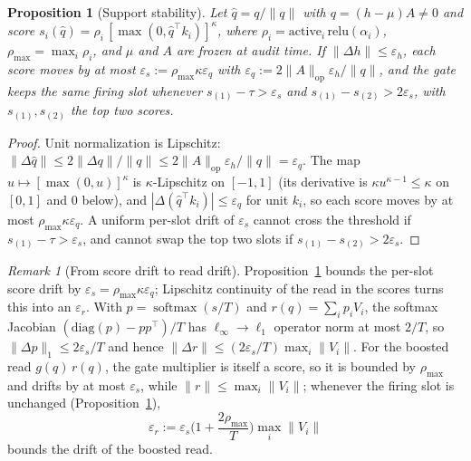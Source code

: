 \documentclass[11pt]{article}
\newtheorem{proposition}{Proposition}
\theoremstyle{remark}
\newtheorem{remark}{Remark}
\DeclareMathOperator{\softmax}{softmax}
\begin{document}
\begin{proposition}[Support stability]
\label{prop:support}
Let $\hat q=q/\lVert q\rVert$ with $q=(h-\mu)A\neq0$ and score
$s_i(\hat q)=\rho_i\,[\max(0,\hat q^{\top}k_i)]^{\kappa}$, where
$\rho_i=\mathrm{active}_i\,\mathrm{relu}(\alpha_i)$,
$\rho_{\max}=\max_i\rho_i$, and $\mu$ and $A$ are frozen at audit time. If
$\lVert\Delta h\rVert\le\varepsilon_h$, each score moves by at most
$\varepsilon_s:=\rho_{\max}\kappa\varepsilon_q$ with
$\varepsilon_q:=2\lVert A\rVert_{\mathrm{op}}\varepsilon_h/\lVert q\rVert$, and
the gate keeps the same firing slot whenever $s_{(1)}-\tau>\varepsilon_s$ and
$s_{(1)}-s_{(2)}>2\varepsilon_s$, with $s_{(1)},s_{(2)}$ the top two scores.
\end{proposition}
\begin{proof}
Unit normalization is Lipschitz:
$\lVert\Delta\hat q\rVert\le 2\lVert\Delta q\rVert/\lVert q\rVert
\le 2\lVert A\rVert_{\mathrm{op}}\varepsilon_h/\lVert q\rVert=\varepsilon_q$.
The map $u\mapsto[\max(0,u)]^{\kappa}$ is $\kappa$-Lipschitz on $[-1,1]$ (its
derivative is $\kappa u^{\kappa-1}\le\kappa$ on $[0,1]$ and $0$ below), and
$|\Delta(\hat q^{\top}k_i)|\le\varepsilon_q$ for unit $k_i$, so each score moves
by at most $\rho_{\max}\kappa\varepsilon_q$. A uniform per-slot drift of
$\varepsilon_s$ cannot cross the threshold if $s_{(1)}-\tau>\varepsilon_s$, and
cannot swap the top two slots if $s_{(1)}-s_{(2)}>2\varepsilon_s$.
\end{proof}

\begin{remark}[From score drift to read drift]
\label{rem:epsr}
Proposition~\ref{prop:support} bounds the per-slot score drift by
$\varepsilon_s=\rho_{\max}\kappa\varepsilon_q$; Lipschitz continuity of the
read in the scores turns this into an $\varepsilon_r$. With $p=\softmax(s/T)$
and $r(q)=\sum_i p_i V_i$, the softmax Jacobian
$(\mathrm{diag}(p)-pp^{\top})/T$ has $\ell_\infty\!\to\!\ell_1$ operator norm
at most $2/T$, so $\lVert\Delta p\rVert_1\le 2\varepsilon_s/T$ and hence
$\lVert\Delta r\rVert\le(2\varepsilon_s/T)\max_i\lVert V_i\rVert$. For the
boosted read $g(q)\,r(q)$,
the gate multiplier is itself a score, so it is bounded by $\rho_{\max}$ and
drifts by at most $\varepsilon_s$, while $\lVert r\rVert\le\max_i\lVert
V_i\rVert$; whenever the firing slot is unchanged
(Proposition~\ref{prop:support}),
\[
\varepsilon_r:=\varepsilon_s\Big(1+\frac{2\rho_{\max}}{T}\Big)\max_i\lVert V_i\rVert
\]
bounds the drift of the boosted read.
\end{remark}
\end{document}
